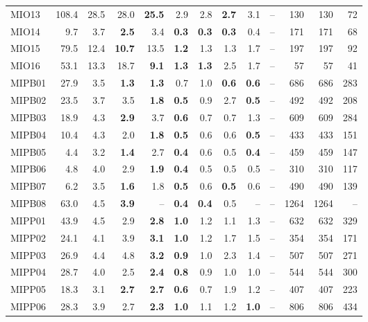 \begin{table}[!htbp]
\begin{tabular}{l rrrr | rrrr | rrrr}
MIO13 & 108.4 & 28.5 & 28.0 & \textbf{25.5} & 2.9 & 2.8 & \textbf{2.7} & 3.1 & -- & 130 & 130 & 72 \\
MIO14 & 9.7 & 3.7 & \textbf{2.5} & 3.4 & \textbf{0.3} & \textbf{0.3} & \textbf{0.3} & 0.4 & -- & 171 & 171 & 68 \\
MIO15 & 79.5 & 12.4 & \textbf{10.7} & 13.5 & \textbf{1.2} & 1.3 & 1.3 & 1.7 & -- & 197 & 197 & 92 \\
MIO16 & 53.1 & 13.3 & 18.7 & \textbf{9.1} & \textbf{1.3} & \textbf{1.3} & 2.5 & 1.7 & -- & 57 & 57 & 41 \\
MIPB01 & 27.9 & 3.5 & \textbf{1.3} & \textbf{1.3} & 0.7 & 1.0 & \textbf{0.6} & \textbf{0.6} & -- & 686 & 686 & 283 \\
MIPB02 & 23.5 & 3.7 & 3.5 & \textbf{1.8} & \textbf{0.5} & 0.9 & 2.7 & \textbf{0.5} & -- & 492 & 492 & 208 \\
MIPB03 & 18.9 & 4.3 & \textbf{2.9} & 3.7 & \textbf{0.6} & 0.7 & 0.7 & 1.3 & -- & 609 & 609 & 284 \\
MIPB04 & 10.4 & 4.3 & 2.0 & \textbf{1.8} & \textbf{0.5} & 0.6 & 0.6 & \textbf{0.5} & -- & 433 & 433 & 151 \\
MIPB05 & 4.4 & 3.2 & \textbf{1.4} & 2.7 & \textbf{0.4} & 0.6 & 0.5 & \textbf{0.4} & -- & 459 & 459 & 147 \\
MIPB06 & 4.8 & 4.0 & 2.9 & \textbf{1.9} & \textbf{0.4} & 0.5 & 0.5 & 0.5 & -- & 310 & 310 & 117 \\
MIPB07 & 6.2 & 3.5 & \textbf{1.6} & 1.8 & \textbf{0.5} & 0.6 & \textbf{0.5} & 0.6 & -- & 490 & 490 & 139 \\
MIPB08 & 63.0 & 4.5 & \textbf{3.9} & -- & \textbf{0.4} & \textbf{0.4} & 0.5 & -- & -- & 1264 & 1264 & -- \\
MIPP01 & 43.9 & 4.5 & 2.9 & \textbf{2.8} & \textbf{1.0} & 1.2 & 1.1 & 1.3 & -- & 632 & 632 & 329 \\
MIPP02 & 24.1 & 4.1 & 3.9 & \textbf{3.1} & \textbf{1.0} & 1.2 & 1.7 & 1.5 & -- & 354 & 354 & 171 \\
MIPP03 & 26.9 & 4.4 & 4.8 & \textbf{3.2} & \textbf{0.9} & 1.0 & 2.3 & 1.4 & -- & 507 & 507 & 271 \\
MIPP04 & 28.7 & 4.0 & 2.5 & \textbf{2.4} & \textbf{0.8} & 0.9 & 1.0 & 1.0 & -- & 544 & 544 & 300 \\
MIPP05 & 18.3 & 3.1 & \textbf{2.7} & \textbf{2.7} & \textbf{0.6} & 0.7 & 1.9 & 1.2 & -- & 407 & 407 & 223 \\
MIPP06 & 28.3 & 3.9 & 2.7 & \textbf{2.3} & \textbf{1.0} & 1.1 & 1.2 & \textbf{1.0} & -- & 806 & 806 & 434 \\

\end{tabular}
\end{table}
